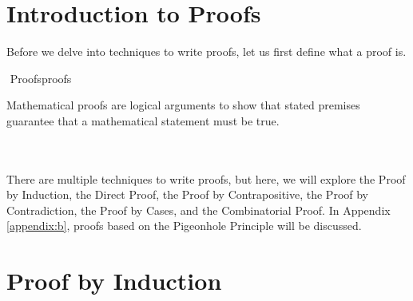 \section{Introduction to Proofs}
    
    Before we delve into techniques to write proofs, let us first define what a proof is. 
    \begin{definition}{\Stop\,\,Proofs}{proofs}
    
        Mathematical proofs are logical arguments to show that stated premises guarantee that a mathematical statement must be true.
    
    \end{definition}
    \vphantom
    \\
    \\
    There are multiple techniques to write proofs, but here, we will explore the Proof by Induction, the Direct Proof, the Proof by Contrapositive, the Proof by Contradiction, the Proof by Cases, and the Combinatorial Proof. In Appendix \ref{appendix:b}, proofs based on the Pigeonhole Principle will be discussed.
    
\section{Proof by Induction}

